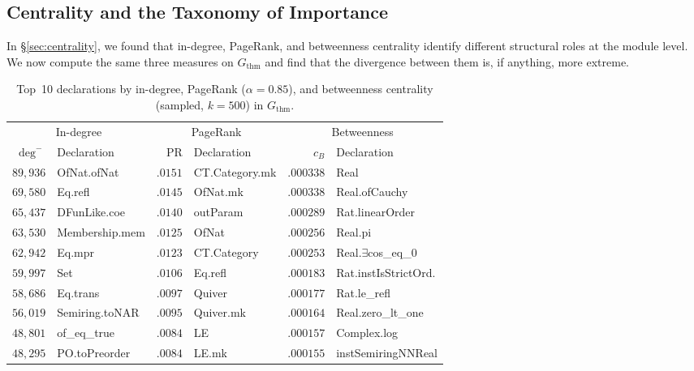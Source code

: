 \subsection{Centrality and the Taxonomy of Importance}
\label{sec:thm-centrality}

In \S\ref{sec:centrality}, we found that in-degree, PageRank, and betweenness centrality identify different structural roles at the module level. We now compute the same three measures on $G_{\mathrm{thm}}$ and find that the divergence between them is, if anything, more extreme.

\begin{table}[ht]
\centering
\caption{Top~10 declarations by in-degree, PageRank ($\alpha = 0.85$), and betweenness centrality (sampled, $k = 500$) in $G_{\mathrm{thm}}$.}
\label{tab:thm-centrality}
\small
\begin{tabular}{rlrlrl}
\toprule
\multicolumn{2}{c}{In-degree} & \multicolumn{2}{c}{PageRank} & \multicolumn{2}{c}{Betweenness} \\
\cmidrule(lr){1-2} \cmidrule(lr){3-4} \cmidrule(lr){5-6}
$\deg^{-}$ & Declaration & PR & Declaration & $c_B$ & Declaration \\
\midrule
$89{,}936$ & OfNat.ofNat       & $.0151$ & CT.Category.mk    & $.000338$ & Real \\
$69{,}580$ & Eq.refl           & $.0145$ & OfNat.mk           & $.000338$ & Real.ofCauchy \\
$65{,}437$ & DFunLike.coe      & $.0140$ & outParam           & $.000289$ & Rat.linearOrder \\
$63{,}530$ & Membership.mem    & $.0125$ & OfNat              & $.000256$ & Real.pi \\
$62{,}942$ & Eq.mpr            & $.0123$ & CT.Category        & $.000253$ & Real.$\exists$cos\_eq\_0 \\
$59{,}997$ & Set               & $.0106$ & Eq.refl            & $.000183$ & Rat.instIsStrictOrd. \\
$58{,}686$ & Eq.trans          & $.0097$ & Quiver             & $.000177$ & Rat.le\_refl \\
$56{,}019$ & Semiring.toNAR    & $.0095$ & Quiver.mk          & $.000164$ & Real.zero\_lt\_one \\
$48{,}801$ & of\_eq\_true      & $.0084$ & LE                 & $.000157$ & Complex.log \\
$48{,}295$ & PO.toPreorder     & $.0084$ & LE.mk              & $.000155$ & instSemiringNNReal \\
\bottomrule
\end{tabular}
\end{table}

